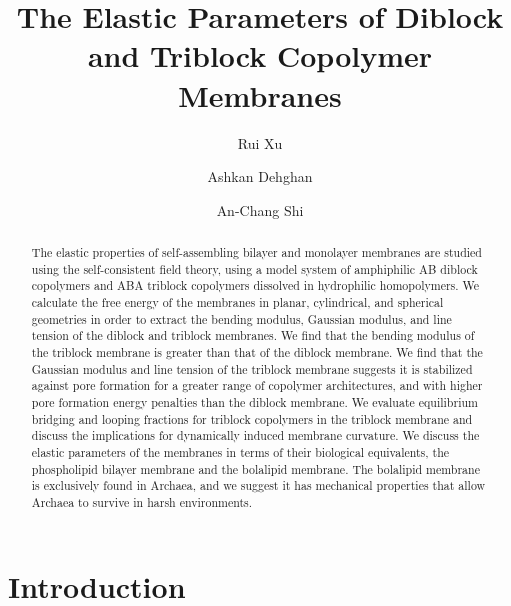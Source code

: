 \documentclass[twocolumn,aps,floatfix,nobibnotes]{revtex4-1}
\begin{document}
\title{The Elastic Parameters of Diblock and Triblock Copolymer Membranes}

\author{Rui Xu}
\author{Ashkan Dehghan}
\author{An-Chang Shi}

\begin{abstract}
The elastic properties of self-assembling bilayer and monolayer membranes are studied using the self-consistent field theory, using a model system of amphiphilic AB diblock copolymers and ABA triblock copolymers dissolved in hydrophilic homopolymers. We calculate the free energy of the membranes in planar, cylindrical, and spherical geometries in order to extract the bending modulus, Gaussian modulus, and line tension of the diblock and triblock membranes.  We find that the bending modulus of the triblock membrane is greater than that of the diblock membrane. We find that the Gaussian modulus and line tension of the triblock membrane suggests it is stabilized against pore formation for a greater range of copolymer architectures, and with higher pore formation energy penalties than the diblock membrane. We evaluate equilibrium bridging and looping fractions for triblock copolymers in the triblock membrane and discuss the implications for dynamically induced membrane curvature. We discuss the elastic parameters of the membranes in terms of their biological equivalents, the phospholipid bilayer membrane and the bolalipid membrane. The bolalipid membrane is exclusively found in Archaea, and we suggest it has mechanical properties that allow Archaea to survive in harsh environments.
\end{abstract}


\maketitle


\section{Introduction}
\label{sec:introduction}
\end{document}
